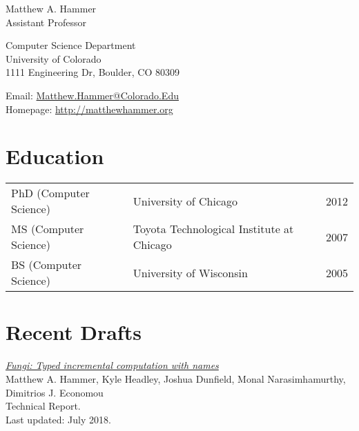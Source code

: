 \documentclass[10pt,letterpaper]{article}
\def\name{Matthew A. Hammer}
\renewenvironment{itemize}{
  \begin{list}{}{
    \setlength{\leftmargin}{1.5em}
    \setlength{\itemsep}{0.25em}
    \setlength{\parskip}{0pt}
    \setlength{\parsep}{0.25em}
  }
}{
  \end{list}
}
\begin{document}
{{\huge \name}
\\
Assistant Professor
}


\bigskip

\begin{minipage}[t]{0.495\textwidth}
Computer Science Department\\
University of Colorado\\
1111 Engineering Dr, Boulder, CO 80309
\end{minipage}
\begin{minipage}[t]{0.495\textwidth}
  Email: \href{mailto:matthew.hammer@colorado.edu}{Matthew.Hammer@Colorado.Edu} \\
  Homepage: \href{http://matthewhammer.org}{http://matthewhammer.org}
\end{minipage}

\section*{Education}

\begin{tabular}[t]{@{}l l l@{}}
PhD (Computer Science) & University of Chicago & 2012 \\
MS  (Computer Science) & Toyota Technological Institute at Chicago & 2007 \\
BS  (Computer Science) & University of Wisconsin & 2005 \\
\end{tabular}




\section*{Recent Drafts}

\begin{itemize}

\item
\href{https://arxiv.org/abs/1808.07826}
{\textit{Fungi: Typed incremental computation with names}}
\\
Matthew A. Hammer, Kyle Headley, Joshua Dunfield, Monal Narasimhamurthy, Dimitrios J. Economou
\\
Technical Report.
\\
Last updated: July 2018.

\end{itemize}
\end{document}
